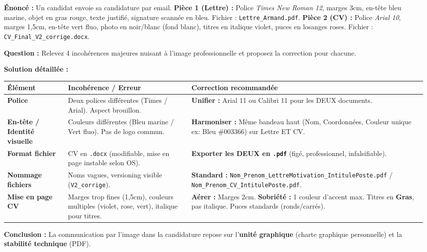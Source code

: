\documentclass[11pt]{article}
\begin{document}
\begin{exoresolu}
    \textbf{Énoncé :} Un candidat envoie sa candidature par email.
    \textbf{Pièce 1 (Lettre) :} Police \textit{Times New Roman 12}, marges 3cm, en-tête bleu marine, objet en gras rouge, texte justifié, signature scannée en bleu. Fichier : \texttt{Lettre\_Armand.pdf}.
    \textbf{Pièce 2 (CV) :} Police \textit{Arial 10}, marges 1,5cm, en-tête vert fluo, photo en noir/blanc (fond blanc), titres en italique violet, puces en losanges roses. Fichier : \texttt{CV\_Final\_V2\_corrige.docx}.

    \textbf{Question :} Relevez 4 incohérences majeures nuisant à l'image professionnelle et proposez la correction pour chacune.

    \tcblower
    \textbf{Solution détaillée :}

    \begin{center}
    \begin{tabularx}{\linewidth}{|l|X|X|}\hline
    \textbf{Élément} & \textbf{Incohérence / Erreur} & \textbf{Correction recommandée} \\ \hline
    \textbf{Police} & Deux polices différentes (Times / Arial). Aspect brouillon. & \textbf{Unifier :} Arial 11 ou Calibri 11 pour les DEUX documents. \\ \hline
    \textbf{En-tête / Identité visuelle} & Couleurs différentes (Bleu marine / Vert fluo). Pas de logo commun. & \textbf{Harmoniser :} Même bandeau haut (Nom, Coordonnées, Couleur unique ex: Bleu \#003366) sur Lettre ET CV. \\ \hline
    \textbf{Format fichier} & CV en \texttt{.docx} (modifiable, mise en page instable selon OS). & \textbf{Exporter les DEUX en \texttt{.pdf}} (figé, professionnel, infalsifiable). \\ \hline
    \textbf{Nommage fichiers} & Noms vagues, versioning visible (\texttt{V2\_corrige}). & \textbf{Standard :} \texttt{Nom\_Prenom\_LettreMotivation\_IntitulePoste.pdf} / \texttt{Nom\_Prenom\_CV\_IntitulePoste.pdf}. \\ \hline
    \textbf{Mise en page CV} & Marges trop fines (1,5cm), couleurs multiples (violet, rose, vert), italique pour titres. & \textbf{Aérer :} Marges 2cm. \textbf{Sobriété :} 1 couleur d'accent max. Titres en \textbf{Gras}, pas italique. Puces standards (ronds/carrés). \\ \hline
    \end{tabularx}
    \end{center}
    \textbf{Conclusion :} La communication par l'image dans la candidature repose sur l'\textbf{unité graphique} (charte graphique personnelle) et la \textbf{stabilité technique} (PDF).
\end{exoresolu}
\end{document}
